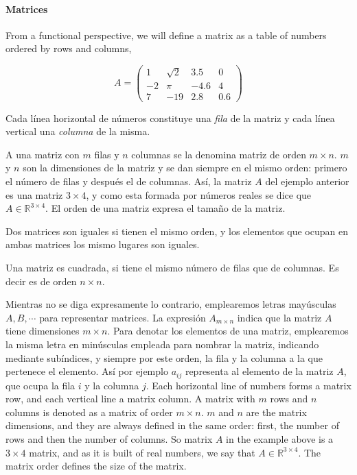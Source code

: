 \begin{paracol}{2}
\paragraph{Matrices} From a functional perspective, we will define a matrix as a table of numbers ordered by rows and columns,
\end{paracol}

\begin{equation*}
A=
\begin{pmatrix}
1& \sqrt{2}& 3.5& 0\\
-2& \pi& -4.6& 4\\
7& -19& 2.8& 0.6
\end{pmatrix}
\end{equation*}

\begin{paracol}{2}
Cada línea horizontal de números constituye una \emph{fila} de la matriz y cada línea vertical una \emph{columna} de la misma.

A una matriz con $m$ filas y $n$ columnas se la denomina matriz de orden $m\times n$. $m$ y $n$ son la dimensiones de la matriz y se dan siempre en el mismo orden: primero el número de filas y después el de columnas. Así, la matriz $A$ del ejemplo anterior es una matriz $3\times 4$, y como esta formada por números reales se dice que $A\in\mathbb{R}^{3\times 4}$. El orden de una matriz expresa el tamaño de la matriz.

Dos matrices son iguales si tienen el mismo orden, y los elementos que ocupan en ambas matrices los mismo lugares son iguales.

Una matriz es cuadrada, si tiene el mismo número de filas que de columnas. Es decir es de orden $n\times n$.

Mientras no se diga expresamente lo contrario, emplearemos letras mayúsculas $A, B, \cdots$ para representar matrices. La expresión $A_{m\times n}$ indica que la matriz $A$ tiene dimensiones $m \times n$. Para denotar los elementos de una matriz, emplearemos la misma letra en minúsculas empleada para nombrar la matriz, indicando mediante subíndices, y siempre por este orden, la fila y la columna a la que pertenece el elemento. Así por ejemplo $a_{ij}$ representa al elemento de la matriz $A$, que ocupa la fila $i$ y la columna $j$.
\switchcolumn
Each horizontal line of numbers forms a matrix row, and each vertical line a matrix column.
A matrix with $m$ rows and $n$ columns is denoted as a matrix of order $m\times n$. $m$ and $n$ are the matrix dimensions, and they are always defined in the same order: first, the number of rows and then the number of columns. So matrix $A$ in the example above is a $3\times 4$ matrix, and as it is built of real numbers, we say that $A\in \mathbb{R}^{3\times 4}$. The matrix order defines the size of the matrix.


\end{paracol}

